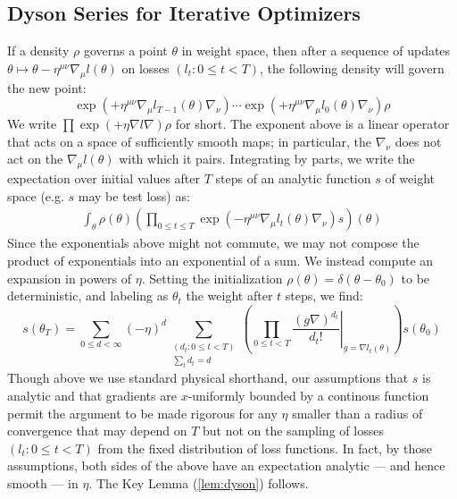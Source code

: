 \documentclass{article}
\begin{document}
    \subsection*{Dyson Series for Iterative Optimizers}
        If a density $\rho$ governs a point $\theta$ in weight space, then
        after a sequence of updates $\theta \mapsto \theta - \eta^{\mu\nu}
        \nabla_\mu l(\theta)$ on losses $(l_t: 0\leq t < T)$, the following
        density will govern the new point:
        \begin{equation}\label{eq:descexp}
            \exp\left(+\eta^{\mu\nu} \nabla_\mu l_{T-1}(\theta) \nabla_\nu\right)
            \cdots
            \exp\left(+\eta^{\mu\nu} \nabla_\mu l_0(\theta) \nabla_\nu\right)
            \rho
        \end{equation}
        We write 
        $
            \prod \exp\left(+\eta \nabla l \nabla\right) \rho
        $
        for short.  The exponent above is a linear operator that acts on a
        space of sufficiently smooth maps; in particular, the $\nabla_\nu$ does
        not act on the $\nabla_\mu l(\theta)$ with which it pairs.  Integrating
        by parts, we write the expectation over initial values after $T$ steps
        of an analytic function $s$ of weight space (e.g. $s$ may be test loss)
        as:
        \begin{align}\label{eq:contraexp}
            \int_\theta \rho(\theta) \left(
                \prod_{0 \leq t \leq T} \exp\left(
                    -\eta^{\mu\nu} \nabla_\mu l_t(\theta) \nabla_\nu
                \right) s
            \right)(\theta)
        \end{align}
        Since the exponentials above might not commute, we may not compose the
        product of exponentials into an exponential of a sum.  We instead
        compute an expansion in powers of $\eta$.  Setting the initialization
        $\rho(\theta) = \delta(\theta-\theta_0)$ to be deterministic, and
        labeling as $\theta_t$ the weight after $t$ steps, we find:
        \begin{equation}\label{eq:dyson}
            s(\theta_T) =
            \sum_{0\leq d < \infty} (-\eta)^d
            \sum_{\substack{(d_t: 0\leq t<T) \\ \sum_t d_t = d}}
            \left(
                \prod_{0 \leq t < T} \left.
                    \frac{(g \nabla)^{d_t}}{d_t!}
                \right|_{g=\nabla l_t(\theta)}
            \right) s (\theta_0)
        \end{equation}
        Though above we use standard physical shorthand, our assumptions that
        $s$ is analytic and that gradients are $x$-uniformly bounded by a
        continous function permit the argument to be made rigorous for any
        $\eta$ smaller than a radius of convergence that may depend on $T$ but
        not on the sampling of losses $(l_t: 0\leq t<T)$ from the fixed
        distribution of loss functions.  In fact, by those assumptions, both
        sides of the above have an expectation analytic --- and hence smooth
        --- in $\eta$.  The Key Lemma (\ref{lem:dyson}) follows.
\end{document}
